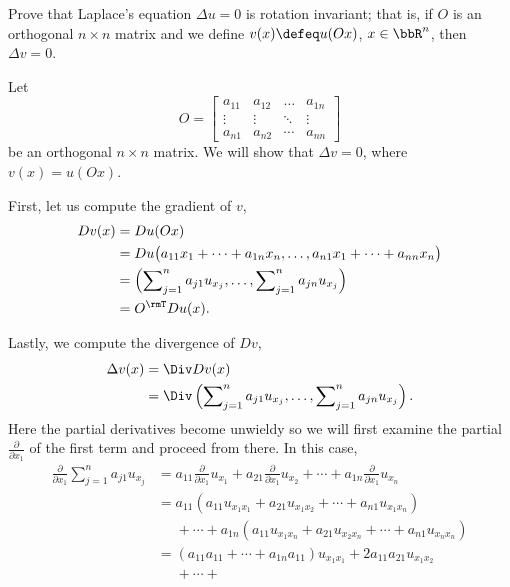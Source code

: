 \begin{problem}
  Prove that Laplace's equation \(\Delta u=0\) is rotation invariant; that
  is, if \(O\) is an orthogonal \(n\times n\) matrix and we define
  \(v(x)\defeq u(Ox)\), \(x\in\bbR^n\), then \(\Delta v=0\).
\end{problem}
\begin{solution}
  Let
  \[
    O=
    \begin{bmatrix}
      a_{11}&a_{12}&\dotsc&a_{1n}\\
      \vdots&\vdots&\ddots&\vdots\\
      a_{n1}&a_{n2}&\cdots&a_{nn}
    \end{bmatrix}
  \]
  be an orthogonal \(n\times n\) matrix. We will show that \(\Delta v=0\),
  where \(v(x)=u(Ox)\).

  First, let us compute the gradient of \(v\),
  \begin{align*}
    Dv(x)
    &=Du(Ox)\\
    &=Du\bigl(a_{11}x_1+\dotsb+a_{1n}x_n,\dotsc,a_{n1}x_1+\dotsb+a_{nn}x_n\bigr)\\
    &=\left(\sum\nolimits_{j=1}^na_{j1}u_{x_j},%
      \dotsc,%
      \sum\nolimits_{j=1}^n a_{jn}u_{x_j}\right)\\
    &=O^\rmT Du(x).
  \end{align*}

  Lastly, we compute the divergence of \(Dv\),
  \begin{align*}
    \Delta v(x)
    &=\Div Dv(x)\\
    &=\Div%
      \left(\sum\nolimits_{j=1}^na_{j1}u_{x_j},%
      \dotsc,%
      \sum\nolimits_{j=1}^n a_{jn}u_{x_j}\right).
  \end{align*}
  Here the partial derivatives become unwieldy so we will first examine the
  partial \(\frac{\partial}{\partial x_1}\) of the first term and proceed
  from there. In this case,
  \begin{align*}
    \frac{\partial}{\partial x_1}\sum_{j=1}^n a_{j1}u_{x_j}
    &=a_{11}\tfrac{\partial}{\partial x_1}u_{x_1}%
      +a_{21}\tfrac{\partial}{\partial x_1}u_{x_2}%
      +\dotsb%
      +a_{1n}\tfrac{\partial}{\partial x_1}u_{x_n}\\
    &=a_{11}(a_{11}u_{x_1x_1}+a_{21}u_{x_1x_2}+\dotsb+a_{n1}u_{x_1x_n})\\
    &\phantom{{}={}}+\dotsb+a_{1n}(a_{11}u_{x_1x_n}+a_{21}u_{x_2x_n}%
      +\dotsb+a_{n1}u_{x_nx_n})\\
    &=(a_{11}a_{11}+\dotsb+a_{1n}a_{11})u_{x_1x_1}+2a_{11}a_{21}u_{x_1x_2}\\
    &\phantom{{}={}}+\dotsb+
  \end{align*}


\end{solution}
